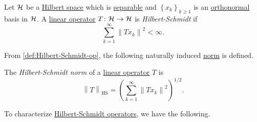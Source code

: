 \begin{definition}\label{def:Hilbert-Schmidt-op}
	Let \(\mathcal{\MakeUppercase{h}} \) be a \hyperref[def:Hilbert-space]{Hilbert space} which is \hyperref[def:separable]{separable} and \(\left\{ x_k \right\} _{k\geq 1}\) is an \hyperref[def:orthonormal-system]{orthonormal} basis in \(\mathcal{\MakeUppercase{h}} \). A \hyperref[def:linear-map]{linear operator} \(T\colon \mathcal{\MakeUppercase{h}} \to \mathcal{\MakeUppercase{h}} \) is \emph{Hilbert-Schmidt} if
	\[
		\sum_{k=1}^{\infty} \left\lVert T x_{k} \right\rVert ^{2} < \infty.
	\]
\end{definition}

From \autoref{def:Hilbert-Schmidt-op}, the following naturally induced \hyperref[def:norm]{norm} is defined.

\begin{definition}\label{def:Hilbert-Schmidt-norm}
	The \emph{Hilbert-Schmidt norm} of a \hyperref[def:linear-map]{linear operator} \(T\) is
	\[
		\left\lVert T\right\rVert _{\mathrm{HS} } = \left( \sum_{k=1}^{\infty} \left\lVert T x_{k} \right\rVert ^2 \right) ^{1 / 2}.
	\]
\end{definition}

To characterize \hyperref[def:Hilbert-Schmidt-op]{Hilbert-Schmidt operators}, we have the following.

